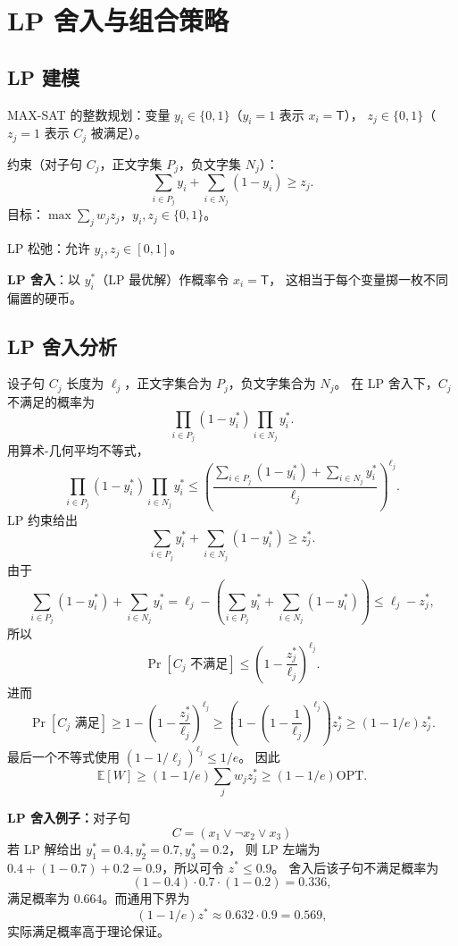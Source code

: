 \documentclass[UTF8,openany,12pt]{ctexbook}
\theoremstyle{remark}
\newcommand{\OPT}{\mathrm{OPT}}
\begin{document}
\section{LP 舍入与组合策略}

\subsection{LP 建模}

MAX-SAT 的整数规划：变量 $y_i \in \{0,1\}$（$y_i=1$ 表示 $x_i=\mathsf{T}$），
$z_j \in \{0,1\}$（$z_j=1$ 表示 $C_j$ 被满足）。

约束（对子句 $C_j$，正文字集 $P_j$，负文字集 $N_j$）：
\[
  \sum_{i \in P_j} y_i + \sum_{i \in N_j} (1-y_i) \ge z_j.
\]
目标：$\max \sum_j w_j z_j$，$y_i, z_j \in \{0,1\}$。

LP 松弛：允许 $y_i, z_j \in [0,1]$。

\textbf{LP 舍入}：以 $y_i^*$（LP 最优解）作概率令 $x_i=\mathsf{T}$，
这相当于每个变量掷一枚不同偏置的硬币。

\subsection{LP 舍入分析}

设子句 $C_j$ 长度为 $\ell_j$，正文字集合为 $P_j$，负文字集合为 $N_j$。
在 LP 舍入下，$C_j$ 不满足的概率为
\[
  \prod_{i\in P_j}(1-y_i^*)\prod_{i\in N_j}y_i^*.
\]
用算术-几何平均不等式，
\[
  \prod_{i\in P_j}(1-y_i^*)\prod_{i\in N_j}y_i^*
  \le
  \left(
  \frac{\sum_{i\in P_j}(1-y_i^*)+\sum_{i\in N_j}y_i^*}{\ell_j}
  \right)^{\ell_j}.
\]
LP 约束给出
\[
  \sum_{i\in P_j}y_i^*+\sum_{i\in N_j}(1-y_i^*)\ge z_j^*.
\]
由于
\[
  \sum_{i\in P_j}(1-y_i^*)+\sum_{i\in N_j}y_i^*
  =\ell_j-\left(\sum_{i\in P_j}y_i^*+\sum_{i\in N_j}(1-y_i^*)\right)
  \le \ell_j-z_j^*,
\]
所以
\[
  \Pr[C_j\text{ 不满足}]
  \le \left(1-\frac{z_j^*}{\ell_j}\right)^{\ell_j}.
\]
进而
\[
  \Pr[C_j\text{ 满足}]
  \ge 1-\left(1-\frac{z_j^*}{\ell_j}\right)^{\ell_j}
  \ge \left(1-\left(1-\frac1{\ell_j}\right)^{\ell_j}\right)z_j^*
  \ge (1-1/e)z_j^*.
\]
最后一个不等式使用 $\left(1-1/\ell_j\right)^{\ell_j}\le 1/e$。
因此
\[
  \mathbb E[W]\ge (1-1/e)\sum_j w_jz_j^*\ge (1-1/e)\OPT.
\]

\textbf{LP 舍入例子：}对子句
\[
  C=(x_1\vee \neg x_2\vee x_3)
\]
若 LP 解给出 $y_1^*=0.4,y_2^*=0.7,y_3^*=0.2$，
则 LP 左端为 $0.4+(1-0.7)+0.2=0.9$，所以可令 $z^*\le0.9$。
舍入后该子句不满足概率为
\[
  (1-0.4)\cdot 0.7\cdot(1-0.2)=0.336,
\]
满足概率为 $0.664$。而通用下界为
\[
  (1-1/e)z^*\approx0.632\cdot0.9=0.569,
\]
实际满足概率高于理论保证。
\end{document}
